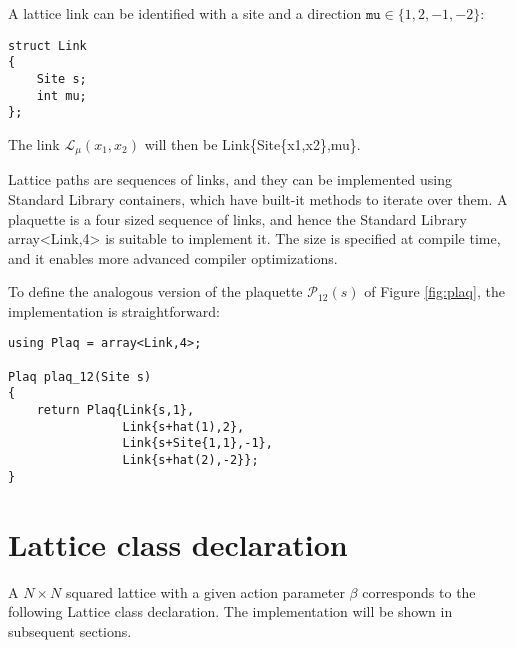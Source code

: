 A lattice link can be identified with a site and a direction $\texttt{mu} \in \{1,2,-1,-2\}$:
\begin{lstlisting}[caption={Link type}]
struct Link
{
    Site s;
    int mu;
};
\end{lstlisting}
The link $\mathcal L_\mu(x_1,x_2)$ will then be {\ttfamily Link\{Site\{x1,x2\},mu\}}.


Lattice paths are sequences of links, and they can be implemented using Standard Library containers, which have built-it methods to iterate over them.
A plaquette is a four sized sequence of links, and hence the Standard Library {\ttfamily array<Link,4>} is suitable to implement it.
The size is specified at compile time,
and it enables more advanced compiler optimizations.

To define the analogous version of the plaquette $\mathcal P_{12}(s)$ of Figure \ref{fig:plaq}, the implementation is straightforward:
\begin{lstlisting}[caption={Plaquette type}]
using Plaq = array<Link,4>;

Plaq plaq_12(Site s)
{
    return Plaq{Link{s,1},
                Link{s+hat(1),2},
                Link{s+Site{1,1},-1},
                Link{s+hat(2),-2}};
}
\end{lstlisting}

\section{Lattice class declaration}

A $N \times N$ squared lattice with a given action parameter $\beta$ corresponds to the following {\ttfamily Lattice} class declaration.
The implementation will be shown in subsequent sections.

